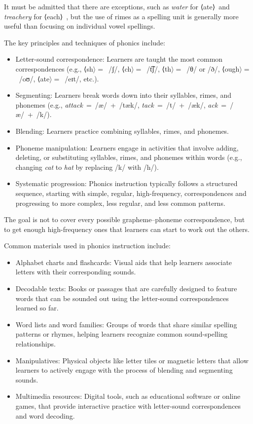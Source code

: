 It must be admitted that there are exceptions, such as \textit{water} for ⟨ate⟩~and \textit{treachery} for ⟨each⟩~, but the use of rimes as a spelling unit is generally more useful than focusing on individual vowel spellings.

The key principles and techniques of phonics include:

\begin{itemize}[noitemsep]
    \item Letter-sound correspondence: Learners are taught the most common correspondences (e.g., ⟨sh$\rangle=$~/ʃ/, ⟨ch$\rangle=$~/t͡ʃ/, ⟨th$\rangle=$~/θ/ or /ð/, ⟨ough$\rangle=$~/oʊ/, ⟨ate$\rangle=$~/eɪt/, etc.).
    \item Segmenting: Learners break words down into their syllables, rimes, and phonemes (e.g., \textit{attack}~=~/æ/~+~/tæk/, \textit{tack}~=~/t/~+~/æk/, \textit{ack}~=~/æ/~+~/k/).
    \item Blending: Learners practice combining syllables, rimes, and phonemes.
    \item Phoneme manipulation: Learners engage in activities that involve adding, deleting, or substituting syllables, rimes, and phonemes within words (e.g., changing \textit{cat} to \textit{hat} by replacing /k/ with /h/).
    \item Systematic progression: Phonics instruction typically follows a structured sequence, starting with simple, regular, high-frequency, correspondences and progressing to more complex, less regular, and less common patterns.
\end{itemize}

The goal is not to cover every possible grapheme--phoneme correspondence, but to get enough high-frequency ones that learners can start to work out the others.

Common materials used in phonics instruction include:

\begin{itemize}[noitemsep]
    \item Alphabet charts and flashcards: Visual aids that help learners associate letters with their corresponding sounds.
    \item Decodable texts: Books or passages that are carefully designed to feature words that can be sounded out using the letter-sound correspondences learned so far.
    \item Word lists and word families: Groups of words that share similar spelling patterns or rhymes, helping learners recognize common sound-spelling relationships.
    \item Manipulatives: Physical objects like letter tiles or magnetic letters that allow learners to actively engage with the process of blending and segmenting sounds.
    \item Multimedia resources: Digital tools, such as educational software or online games, that provide interactive practice with letter-sound correspondences and word decoding.
\end{itemize}

